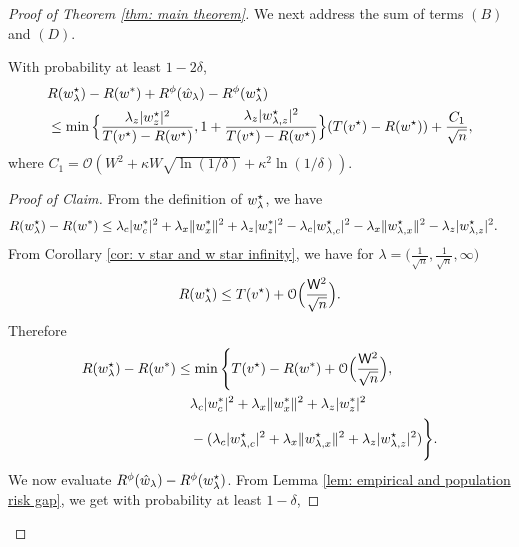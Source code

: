 \begin{proof}[Proof of Theorem \ref{thm: main theorem}]
    We next address the sum of terms $(B)$ and $(D)$.
    \begin{claim}
        With probability at least $1-2\delta$,
        \begin{equation*}
            \begin{aligned}
                &R(w^\star_{\lambda})-R(w^*) + R^\phi(\hat{w}_\lambda) - R^\phi(w^\star_{\lambda}) \\
                &\leq \min\Big\{\frac{\lambda_z|w^\star_z|^2}{T(v^\star)-R(w^\star)},1+\frac{\lambda_z|w^\star_{{\lambda,z}}|^2}{T(v^\star)-R(w^\star)}\Big\} (T(v^\star)-R(w^\star)) + \frac{C_1}{\sqrt{n}},
            \end{aligned}
        \end{equation*}
        where $C_1 = \mathcal{O}\left( W^2 + \kappa W \sqrt{\ln(1/\delta)} + \kappa^2 \ln(1/\delta) \right)$.
    \end{claim}
    \begin{proof}[Proof of Claim]
        From the definition of $w^\star_{\lambda}$, we have
        \begin{equation*}
            \begin{aligned}
                R(w^\star_{\lambda}) - R(w^*) &\leq
                \lambda_c|w^*_{c}|^2 + \lambda_x\|w^*_{x}\|^2 + \lambda_z|w^*_{z}|^2 -
                \lambda_c|w^\star_{{\lambda,c}}|^2 -\lambda_x\|w^\star_{{\lambda,x}}\|^2  -\lambda_z|w^\star_{{\lambda,z}}|^2.
            \end{aligned}
        \end{equation*}
        From Corollary \ref{cor: v star and w star infinity}, we have for $\lambda = \Big(\frac{1}{\sqrt{n}},\frac{1}{\sqrt{n}},\infty\Big)$
        \begin{equation*}
            R(w^\star_{\lambda}) \leq T(v^\star) + \mathcal{O}\Big(\frac{\mathsf{W}^2}{\sqrt{n}}\Big).
        \end{equation*}
        Therefore
        \begin{equation}\label{eqn: risk of whl minus risk of ws}
            \begin{aligned}
            R(w^\star_{\lambda}) - R(w^*) &\leq
            \min\Bigg\{
                T(v^\star)-R(w^*) + \mathcal{O}\Big(\frac{\mathsf{W}^2}{\sqrt{n}}\Big),\\
                &\quad \lambda_c|w^*_{c}|^2 + \lambda_x\|w^*_{x}\|^2 + \lambda_z|w^*_{z}|^2 \\
                &\quad -(\lambda_c|w^\star_{{\lambda,c}}|^2 + \lambda_x\|w^\star_{{\lambda,x}}\|^2 + \lambda_z|w^\star_{{\lambda,z}}|^2)
            \Bigg\}.
            \end{aligned}
        \end{equation}
        We now evaluate $R^\phi(\hat{w}_\lambda) - R^\phi(w^\star_{\lambda})$. From Lemma \ref{lem: empirical and population risk gap}, we get with probability at least $1-\delta$,

\end{proof}
\end{proof}
